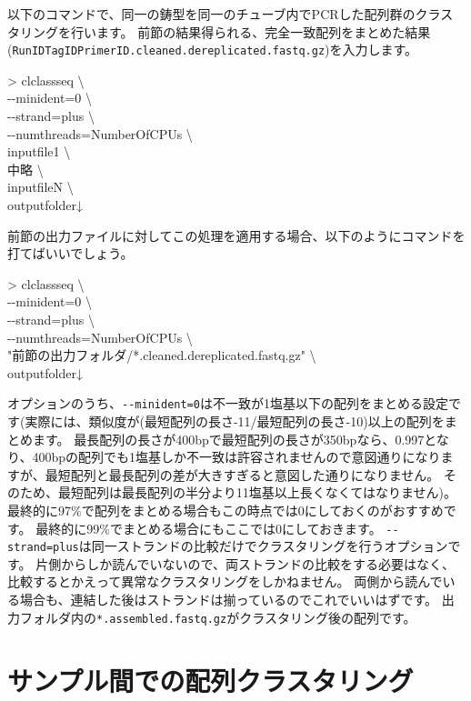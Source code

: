 \documentclass[titlepage,10pt,a4paper,english]{jsbook}
\newenvironment{cmd}{\begin{oframed}\raggedright\ttfamily\footnotesize\setlength{\baselineskip}{1.4em}}{\end{oframed}\vspace{-1em}}
\begin{document}
以下のコマンドで、同一の鋳型を同一のチューブ内でPCRした配列群のクラスタリングを行います。
前節の結果得られる、完全一致配列をまとめた結果(\texttt{RunID{\textunderscore}{\textunderscore}TagID{\textunderscore}{\textunderscore}PrimerID.cleaned.dereplicated.fastq.gz})を入力します。
\begin{cmd}
{\textgreater} clclassseq {\textbackslash}\\
{-}{-}minident=0 {\textbackslash}\\
{-}{-}strand=plus {\textbackslash}\\
{-}{-}numthreads=NumberOfCPUs {\textbackslash}\\
inputfile1 {\textbackslash}\\
中略 {\textbackslash}\\
inputfileN {\textbackslash}\\
outputfolder↓
\end{cmd}
前節の出力ファイルに対してこの処理を適用する場合、以下のようにコマンドを打てばいいでしょう。
\begin{cmd}
{\textgreater} clclassseq {\textbackslash}\\
{-}{-}minident=0 {\textbackslash}\\
{-}{-}strand=plus {\textbackslash}\\
{-}{-}numthreads=NumberOfCPUs {\textbackslash}\\
"前節の出力フォルダ/*.cleaned.dereplicated.fastq.gz" {\textbackslash}\\
outputfolder↓
\end{cmd}
オプションのうち、\texttt{{-}{-}minident=0}は不一致が1塩基以下の配列をまとめる設定です(実際には、類似度が(最短配列の長さ-11/最短配列の長さ-10)以上の配列をまとめます。
最長配列の長さが400bpで最短配列の長さが350bpなら、0.997となり、400bpの配列でも1塩基しか不一致は許容されませんので意図通りになりますが、最短配列と最長配列の差が大きすぎると意図した通りになりません。
そのため、最短配列は最長配列の半分より11塩基以上長くなくてはなりません)。
最終的に97\%で配列をまとめる場合もこの時点では0にしておくのがおすすめです。
最終的に99\%でまとめる場合にもここでは0にしておきます。
\texttt{{-}{-}strand=plus}は同一ストランドの比較だけでクラスタリングを行うオプションです。
片側からしか読んでいないので、両ストランドの比較をする必要はなく、比較するとかえって異常なクラスタリングをしかねません。
両側から読んでいる場合も、連結した後はストランドは揃っているのでこれでいいはずです。
出力フォルダ内の\texttt{*.assembled.fastq.gz}がクラスタリング後の配列です。

\section{サンプル間での配列クラスタリング}
\end{document}
